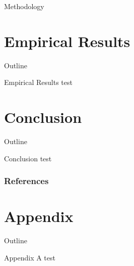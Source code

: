 \documentclass[10pt, mathserif, hyperref={hidelinks,colorlinks=true,linkcolor=blue,citecolor=blue},xcolor={dvipsnames}]{beamer}
\begin{document}
\begin{frame}{Methodology}

\end{frame}

\section{Empirical Results}

{   
    \begin{frame}{Outline}
    \tableofcontents[currentsection]
    \end{frame}
}

\begin{frame}[fragile]{Empirical Results}
    test
\end{frame}

\section{Conclusion}

{
    \begin{frame}{Outline}
    \tableofcontents[currentsection]
    \end{frame}}

\begin{frame}{Conclusion}
    test
\end{frame}

\begin{frame}[t,allowframebreaks]
    \frametitle{References}
    
\end{frame}

\section{Appendix}

{
    \begin{frame}{Outline}
    \tableofcontents[currentsection]
    \end{frame}
}

\begin{frame}{Appendix A}
    test
\end{frame}
\end{document}
